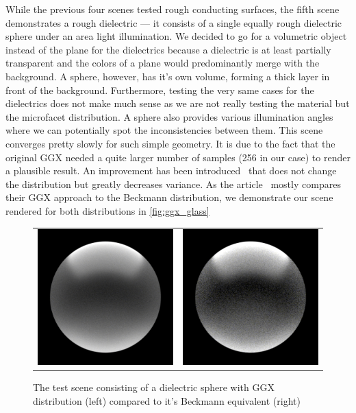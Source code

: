 While the previous four scenes tested rough conducting surfaces, the fifth scene demonstrates a rough dielectric --- it consists of a single equally rough dielectric sphere under an area light illumination. We decided to go for a volumetric object instead of the plane for the dielectrics because a dielectric is at least partially transparent and the colors of a plane would predominantly merge with the background. A sphere, however, has it's own volume, forming a thick layer in front of the background. Furthermore, testing the very same cases for the dielectrics does not make much sense as we are not really testing the material but the microfacet distribution. A sphere also provides various illumination angles where we can potentially spot the inconsistencies between them. This scene converges pretty slowly for such simple geometry. It is due to the fact that the original GGX needed a quite larger number of samples (256 in our case) to render a plausible result. An improvement has been introduced~\cite{heitz2018sampling} that does not change the distribution but greatly decreases variance. As the article~\cite{walter2007microfacet} mostly compares their GGX approach to the Beckmann distribution, we demonstrate our scene rendered for both distributions in \autoref{fig:ggx_glass}

\begin{figure}[h]
	\begin{tabular}{cc}
		\includegraphics[width=.45\linewidth]{img/ggx_glass.png}
		&
		\includegraphics[width=.45\linewidth]{img/beckmann_glass.png}
	\end{tabular}
	\caption{The test scene consisting of a dielectric sphere with GGX distribution (left) compared to it's Beckmann equivalent (right)}
	\label{fig:ggx_glass}
\end{figure}

